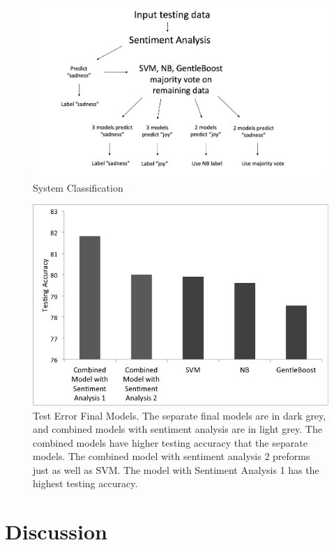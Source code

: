 \documentclass[]{article}
\begin{document}
\begin{figure}
	\centering
  \includegraphics[scale=0.4]{Method.jpg}
  \caption{System Classification}
  \label{fig:System Classification}
\end{figure}

\begin{figure}
	\centering
  \includegraphics[scale=0.4]{finalgraph.jpg}
  \caption{Test Error Final Models. The separate final models are in dark grey, and combined models with sentiment analysis are in light grey. The combined models have higher testing accuracy that the separate models. The combined model with sentiment analysis 2 preforms just as well as SVM. The model with Sentiment Analysis 1 has the highest testing accuracy.}
  \label{fig:Test Error}
\end{figure}

\section{Discussion}
\end{document}
